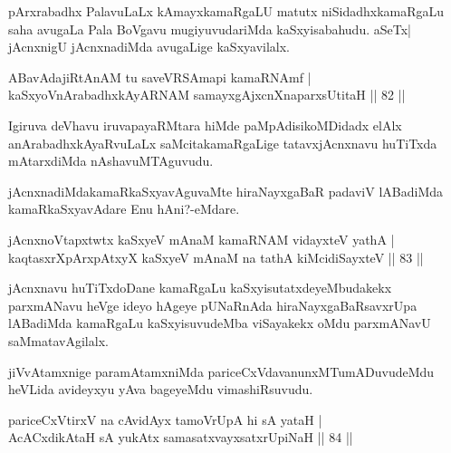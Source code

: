\begin{artha}
pArxrabadhx PalavuLaLx kAmayxkamaRgaLU matutx niSidadhxkamaRgaLu saha avugaLa Pala BoVgavu mugiyuvudariMda kaSxyisabahudu. aSeTx| jAcnxnigU jAcnxnadiMda avugaLige kaSxyavilalx.
\end{artha}

\begin{shl}
ABavAdajiRtAnAM tu saveVRSAmapi kamaRNAmf |\\
kaSxyoV\s nArabadhxkAyARNAM samayxgAjxcnXnaparxsUtitaH \hfill || 82 ||
\end{shl}

\begin{artha}
Igiruva deVhavu iruvapayaRMtara hiMde paMpAdisikoMDidadx elAlx  anArabadhxkAyaRvuLaLx saMcitakamaRgaLige tatavxjAcnxnavu huTiTxda mAtarxdiMda nAshavuMTAguvudu.
\end{artha}

\begin{artha}
jAcnxnadiMdakamaRkaSxyavAguvaMte hiraNayxgaBaR padaviV lABadiMda kamaRkaSxyavAdare Enu hAni?-eMdare.
\end{artha}


\begin{shl}
jAcnxnoVtapxtwtx kaSxyeV mAnaM kamaRNAM vidayxteV yathA |\\
kaqtasxrXpArxpAtxyX kaSxyeV mAnaM na tathA kiMcidiSayxteV \hfill || 83 ||
\end{shl}

\begin{artha}
jAcnxnavu huTiTxdoDane kamaRgaLu kaSxyisutatxdeyeMbudakekx parxmANavu heVge ideyo hAgeye pUNaRnAda hiraNayxgaBaRsavxrUpa lABadiMda kamaRgaLu kaSxyisuvudeMba viSayakekx oMdu parxmANavU saMmatavAgilalx.
\end{artha}

\begin{artha}
jiVvAtamxnige paramAtamxniMda pariceCxVdavanunxMTumADuvudeMdu heVLida avideyxyu yAva bageyeMdu vimashiRsuvudu.
\end{artha}


\begin{shl}
\footnotemark{}pariceCxVtirxV na cAvidAyx tamoVrUpA hi sA yataH |\\
AcACxdikA\s taH sA yukAtx samasatxvayxsatxrUpiNaH \hfill || 84 ||
\end{shl}


